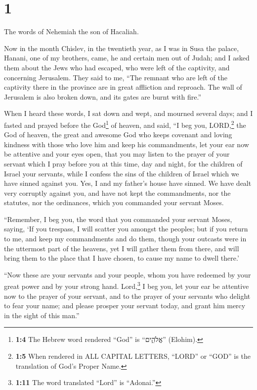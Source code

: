 \hypertarget{section}{%
\section{1}\label{section}}

 The words of Nehemiah the son of Hacaliah.

Now in the month Chislev, in the twentieth year, as I was in Susa the
palace,  Hanani, one of my brothers, came, he and certain
men out of Judah; and I asked them about the Jews who had escaped, who
were left of the captivity, and concerning Jerusalem. 
They said to me, ``The remnant who are left of the captivity there in
the province are in great affliction and reproach. The wall of Jerusalem
is also broken down, and its gates are burnt with fire.''

 When I heard these words, I sat down and wept, and
mourned several days; and I fasted and prayed before the God\footnote{\textbf{1:4}
  The Hebrew word rendered ``God'' is ``אֱלֹהִ֑ים'' (Elohim).} of
heaven,  and said, ``I beg you, LORD,\footnote{\textbf{1:5}
  When rendered in ALL CAPITAL LETTERS, ``LORD'' or ``GOD'' is the
  translation of God's Proper Name.} the God of heaven, the great and
awesome God who keeps covenant and loving kindness with those who love
him and keep his commandments,  let your ear now be
attentive and your eyes open, that you may listen to the prayer of your
servant which I pray before you at this time, day and night, for the
children of Israel your servants, while I confess the sins of the
children of Israel which we have sinned against you. Yes, I and my
father's house have sinned.  We have dealt very corruptly
against you, and have not kept the commandments, nor the statutes, nor
the ordinances, which you commanded your servant Moses.

 ``Remember, I beg you, the word that you commanded your
servant Moses, saying, `If you trespass, I will scatter you amongst the
peoples;  but if you return to me, and keep my
commandments and do them, though your outcasts were in the uttermost
part of the heavens, yet I will gather them from there, and will bring
them to the place that I have chosen, to cause my name to dwell there.'

 ``Now these are your servants and your people, whom you
have redeemed by your great power and by your strong hand.
 Lord,\footnote{\textbf{1:11} The word translated
  ``Lord'' is ``Adonai.''} I beg you, let your ear be attentive now to
the prayer of your servant, and to the prayer of your servants who
delight to fear your name; and please prosper your servant today, and
grant him mercy in the sight of this man.''

